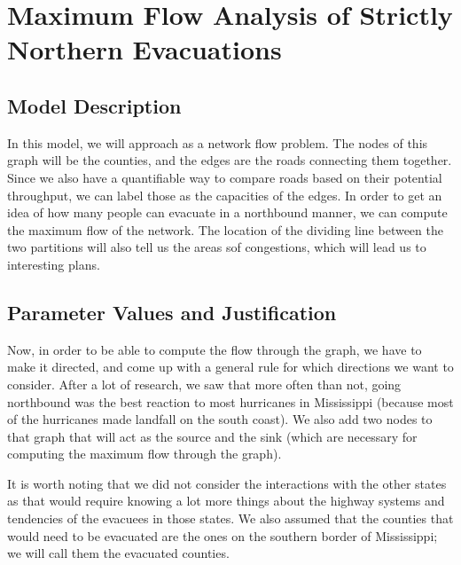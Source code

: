 \documentclass[titlepage]{article}
\begin{document}
\section{Maximum Flow Analysis of Strictly Northern Evacuations}
\label{sec:maxflow}
  \subsection{Model Description}
    \par In this model, we will approach as a network flow problem. The nodes of this graph will be the counties, and the edges are the roads connecting them together. Since we also have a quantifiable way to compare roads based on their potential throughput, we can label those as the capacities of the edges.
    In order to get an idea of how many people can evacuate in a northbound manner, we can compute the maximum flow of the network. The location of the dividing line between the two partitions will also tell us the areas sof congestions, which will lead us to interesting plans.
  \subsection{Parameter Values and Justification}
    \par Now, in order to be able to compute the flow through the graph, we have to make it directed, and come up with a general rule for which directions we want to consider. After a lot of research, we saw that more often than not, going northbound was the best reaction to most hurricanes in Mississippi (because most of the hurricanes made landfall on the south coast).
    We also add two nodes to that graph that will act as the source and the sink (which are necessary for computing the maximum flow through the graph).
    \par It is worth noting that we did not consider the interactions with the other states as that would require knowing a lot more things about the highway systems and tendencies of the evacuees in those states. We also assumed that the counties that would need to be evacuated are the ones on the southern border of Mississippi; we will call them the evacuated counties.
\end{document}
